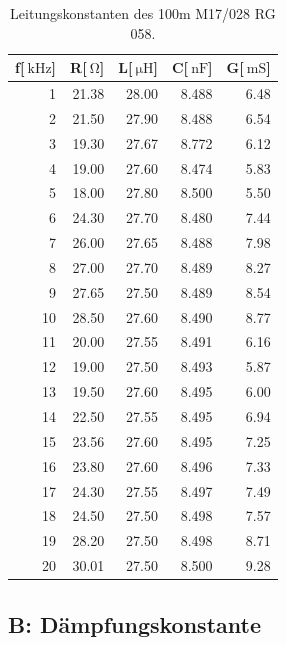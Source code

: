 \begin{table}
\centering
	\caption[]{Leitungskonstanten des 100m M17/028 RG 058.}
	\begin{tabular}{r r r r r}
		f[$\SI{}{\kilo\hertz}$] & R[$\SI{}{\ohm}$] & L[$\SI{}{\micro\henry}$] & C[$\SI{}{\nano \farad}$] & G[$\SI{}{\milli\siemens}$]\\
		\hline \hline
			  1	&	21.38	&	28.00	&	8.488	&	6.48\\
			  2	&	21.50	&	27.90	&	8.488	&	6.54\\
			  3	&	19.30	&	27.67	&	8.772	&	6.12\\
			  4	&	19.00	&	27.60	&	8.474	&	5.83\\
			  5	&	18.00	&	27.80	&	8.500	&	5.50\\
			  6	&	24.30	&	27.70	&	8.480	&	7.44\\
			  7	&	26.00	&	27.65	&	8.488	&	7.98\\
			  8	&	27.00	&	27.70	&	8.489	&	8.27\\
			  9	&	27.65	&	27.50	&	8.489	&	8.54\\
			 10	&	28.50	&	27.60	&	8.490	&	8.77\\
			 11	&	20.00	&	27.55	&	8.491	&	6.16\\
			 12	&	19.00	&	27.50	&	8.493	&	5.87\\
			 13	&	19.50	&	27.60	&	8.495	&	6.00\\
			 14	&	22.50	&	27.55	&	8.495	&	6.94\\
			 15	&	23.56	&	27.60	&	8.495	&	7.25\\
			 16	&	23.80	&	27.60	&	8.496	&	7.33\\
			 17	&	24.30	&	27.55	&	8.497	&	7.49\\
			 18	&	24.50	&	27.50	&	8.498	&	7.57\\
			 19	&	28.20	&	27.50	&	8.498	&	8.71\\
			 20	&	30.01	&	27.50	&	8.500	&	9.28\\
			\hline
	\end{tabular}
	\label{tab_konst3}
\end{table}

\FloatBarrier
\subsection{B: Dämpfungskonstante} %
\label{sub:b_}

